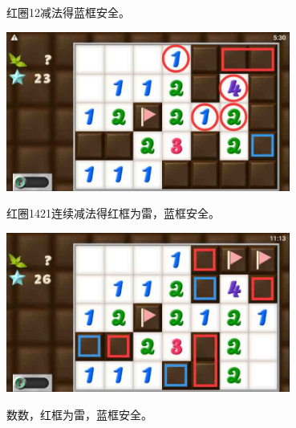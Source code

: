 红圈12减法得蓝框安全。
\begin{center}
    \includegraphics[width=0.7\textwidth]{puzzlelow/214-4.jpg}
\end{center}
红圈1421连续减法得红框为雷，蓝框安全。
\begin{center}
    \includegraphics[width=0.7\textwidth]{puzzlelow/214-5.jpg}
\end{center}
数数，红框为雷，蓝框安全。

